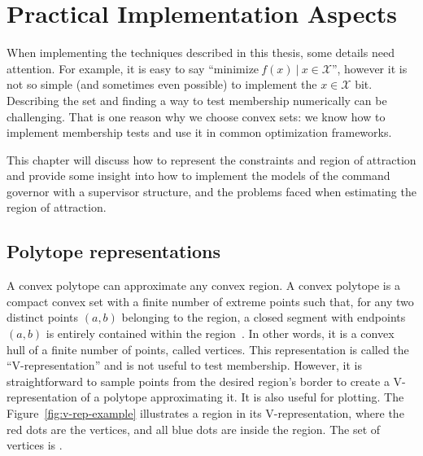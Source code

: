 
\chapter{Practical Implementation Aspects}%
\label{chp:practival-implementation-aspects}

When implementing the techniques described in this thesis, some details need
attention. For example, it is easy to say
\enquote{\(\mathrm{minimize}~f(x)~|~x\in\mathcal{X}\)}, however it is not so
simple (and sometimes even possible) to implement the \(x\in\mathcal{X}\) bit.
Describing the set and finding a way to test membership numerically can be
challenging. That is one reason why we choose convex sets: we know how to
implement membership tests and use it in common optimization frameworks.

This chapter will discuss how to represent the constraints and region of
attraction and provide some insight into how to implement the models of the
command governor with a supervisor structure, and the problems faced when
estimating the region of attraction.

\section{Polytope representations}%
\label{sec:polytope-representation}

A convex polytope can approximate any convex region. A convex polytope is a
compact convex set with a finite number of extreme points such that, for any two
distinct points \((a,b)\) belonging to the region, a closed segment with
endpoints \((a,b)\) is entirely contained within the
region~\parencite{grünbaum:convex}. In other words, it is a convex hull of a
finite number of points, called vertices. This representation is called the
\enquote{V-representation} and is not useful to test membership. However, it is
straightforward to sample points from the desired region's border to create a
V-representation of a polytope approximating it. It is also useful for plotting.
The Figure~\ref{fig:v-rep-example} illustrates a region in its V-representation,
where the red dots are the vertices, and all blue dots are inside the region.
The set of vertices is .

